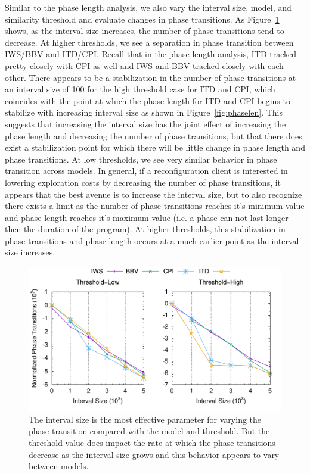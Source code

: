Similar to the phase length analysis, we also vary the interval size, model, and similarity threshold and evaluate changes in phase transitions. As Figure~\ref{fig:phasetransavg} shows, as the interval size increases, the number of phase transitions tend to decrease. At higher thresholds, we see a separation in phase transition between IWS/BBV and ITD/CPI. Recall that in the phase length analysis, ITD tracked pretty closely with CPI as well and IWS and BBV tracked closely with each other. There appears to be a stabilization in the number of phase transitions at an interval size of 100 for the high threshold case for ITD and CPI, which coincides with the point at which the phase length for ITD and CPI begins to stabilize with increasing interval size as shown in Figure~\ref{fig:phaselen}. This suggests that increasing the interval size has the joint effect of increasing the phase length and decreasing the number of phase transitions, but that there does exist a stabilization point for which there will be little change in phase length and phase transitions. At low thresholds, we see very similar behavior in phase transition across models. In general, if a reconfiguration client is interested in lowering exploration costs by decreasing the number of phase transitions, it appears that the best avenue is to increase the interval size, but to also recognize there exists a limit as the number of phase transitions reaches it's minimum value and phase length reaches it's maximum value (i.e. a phase can not last longer then the duration of the program).  At higher thresholds, this stabilization in phase transitions and phase length occurs at a much earlier point as the interval size increases. 

\begin{figure}[htbp]
  \begin{center}
\includegraphics[width=0.95\columnwidth]{figs/phasetransavg}
  \end{center}
  \caption{The interval size is the most effective parameter for varying the phase transition compared with the model and threshold. But the threshold value does impact the rate at which the phase transitions decrease as the interval size grows and this behavior appears to vary between models.}
  \label{fig:phasetransavg}
\end{figure}


